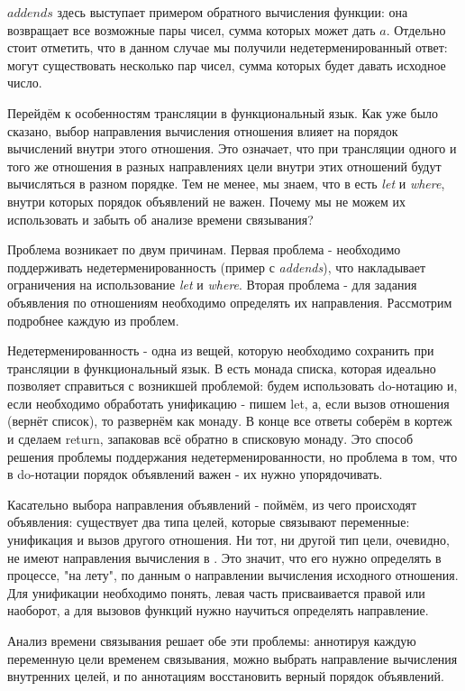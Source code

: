 \documentclass[conference]{IEEEtran}
\begin{document}
$addends$ здесь выступает примером обратного вычисления функции: она возвращает все возможные пары чисел, сумма которых может дать $a$. Отдельно стоит отметить, что в данном случае мы получили недетерменированный ответ: могут существовать несколько пар чисел, сумма которых будет давать исходное число.

Перейдём к особенностям трансляции в функциональный язык. Как уже было сказано, выбор направления вычисления отношения влияет на порядок вычислений внутри этого отношения. Это означает, что при трансляции одного и того же отношения в разных направлениях цели внутри этих отношений будут вычисляться в разном порядке. Тем не менее, мы знаем, что в \haskell есть \emph{let} и \emph{where}, внутри которых порядок объявлений не важен. Почему мы не можем их использовать и забыть об анализе времени связывания?

Проблема возникает по двум причинам. Первая проблема - необходимо поддерживать недетерменированность (пример с \emph{addends}), что накладывает ограничения на использование \emph{let} и \emph{where}. Вторая проблема - для задания объявления по отношениям необходимо определять их направления. Рассмотрим подробнее каждую из проблем.

Недетерменированность - одна из вещей, которую необходимо сохранить при трансляции в функциональный язык. В \haskell есть монада списка, которая идеально позволяет справиться с возникшей проблемой: будем использовать do-нотацию и, если необходимо обработать унификацию - пишем let, а, если вызов отношения (вернёт список), то развернём как монаду. В конце все ответы соберём в кортеж и сделаем return, запаковав всё обратно в списковую монаду. Это способ решения проблемы поддержания недетерменированности, но проблема в том, что в do-нотации порядок объявлений важен - их нужно упорядочивать.

Касательно выбора направления объявлений - поймём, из чего происходят объявления: существует два типа целей, которые связывают переменные: унификация и вызов другого отношения. Ни тот, ни другой тип цели, очевидно, не имеют направления вычисления в \miniKanren. Это значит, что его нужно определять в процессе, "на лету", по данным о направлении вычисления исходного отношения. Для унификации необходимо понять, левая часть присваивается правой или наоборот, а для вызовов функций нужно научиться определять направление.

Анализ времени связывания решает обе эти проблемы: аннотируя каждую переменную цели временем связывания, можно выбрать направление вычисления внутренних целей, и по аннотациям восстановить верный порядок объявлений.
\end{document}
